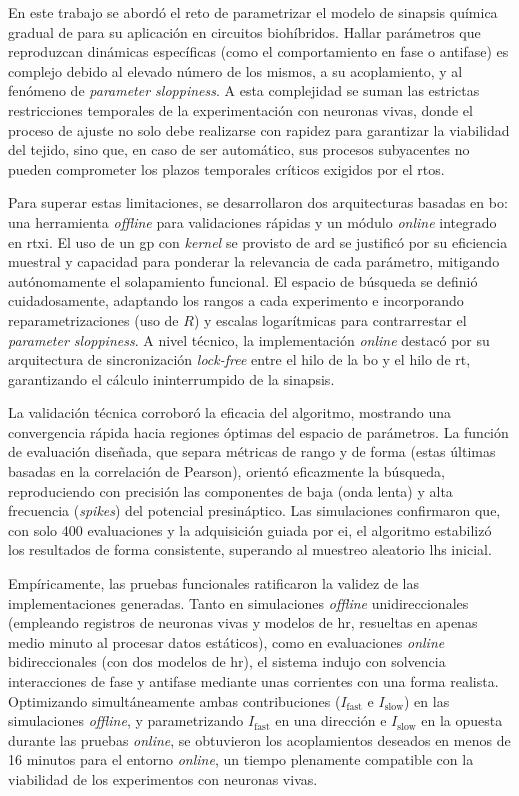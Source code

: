 En este trabajo se abordó el reto de parametrizar el modelo de sinapsis química gradual de \cite{Golowasch1999} para su aplicación en circuitos biohíbridos. Hallar parámetros que reproduzcan dinámicas específicas (como el comportamiento en fase o antifase) es complejo debido al elevado número de los mismos, a su acoplamiento, y al fenómeno de \textit{parameter sloppiness}. A esta complejidad se suman las estrictas restricciones temporales de la experimentación con neuronas vivas, donde el proceso de ajuste no solo debe realizarse con rapidez para garantizar la viabilidad del tejido, sino que, en caso de ser automático, sus procesos subyacentes no pueden comprometer los plazos temporales críticos exigidos por el \ac{rtos}.

Para superar estas limitaciones, se desarrollaron dos arquitecturas basadas en \ac{bo}: una herramienta \textit{offline} para validaciones rápidas y un módulo \textit{online} integrado en \ac{rtxi}. El uso de un \ac{gp} con \textit{kernel} \ac{se} provisto de \ac{ard} se justificó por su eficiencia muestral y capacidad para ponderar la relevancia de cada parámetro, mitigando autónomamente el solapamiento funcional. El espacio de búsqueda se definió cuidadosamente, adaptando los rangos a cada experimento e incorporando reparametrizaciones (uso de $R$) y escalas logarítmicas para contrarrestar el \textit{parameter sloppiness}. A nivel técnico, la implementación \textit{online} destacó por su arquitectura de sincronización \textit{lock-free} entre el hilo de la \ac{bo} y el hilo de \ac{rt}, garantizando el cálculo ininterrumpido de la sinapsis.

La validación técnica corroboró la eficacia del algoritmo, mostrando una convergencia rápida hacia regiones óptimas del espacio de parámetros. La función de evaluación diseñada, que separa métricas de rango y de forma (estas últimas basadas en la correlación de Pearson), orientó eficazmente la búsqueda, reproduciendo con precisión las componentes de baja (onda lenta) y alta frecuencia (\textit{spikes}) del potencial presináptico. Las simulaciones confirmaron que, con solo 400 evaluaciones y la adquisición guiada por \ac{ei}, el algoritmo estabilizó los resultados de forma consistente, superando al muestreo aleatorio \ac{lhs} inicial.

Empíricamente, las pruebas funcionales ratificaron la validez de las implementaciones generadas. Tanto en simulaciones \textit{offline} unidireccionales (empleando registros de neuronas vivas y modelos de \ac{hr}, resueltas en apenas medio minuto al procesar datos estáticos), como en evaluaciones \textit{online} bidireccionales (con dos modelos de \ac{hr}), el sistema indujo con solvencia interacciones de fase y antifase mediante unas corrientes con una forma realista. Optimizando simultáneamente ambas contribuciones ($I_{\mathrm{fast}}$ e $I_{\mathrm{slow}}$) en las simulaciones \textit{offline}, y parametrizando $I_{\mathrm{fast}}$ en una dirección e $I_{\mathrm{slow}}$ en la opuesta durante las pruebas \textit{online}, se obtuvieron los acoplamientos deseados en menos de 16 minutos para el entorno \textit{online}, un tiempo plenamente compatible con la viabilidad de los experimentos con neuronas vivas.

